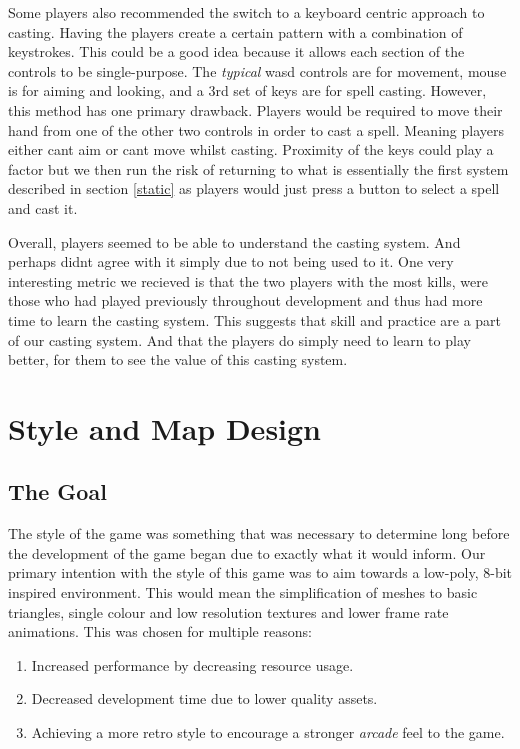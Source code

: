 \documentclass[12pt,a4paper]{report}
\begin{document}
Some players also recommended the switch to a keyboard centric approach to casting. Having the players create a certain pattern with a combination of keystrokes. This could be a good idea because it allows each section of the controls to be single-purpose. The \textit{typical} wasd controls are for movement, mouse is for aiming and looking, and a 3rd set of keys are for spell casting. However, this method has one primary drawback. Players would be required to move their hand from one of the other two controls in order to cast a spell. Meaning players either cant aim or cant move whilst casting. Proximity of the keys could play a factor but we then run the risk of returning to what is essentially the first system described in section \ref{static} as players would just press a button to select a spell and cast it.

Overall, players seemed to be able to understand the casting system. And perhaps didnt agree with it simply due to not being used to it. One very interesting metric we recieved is that the two players with the most kills, were those who had played previously throughout development and thus had more time to learn the casting system. This suggests that skill and practice are a part of our casting system. And that the players do simply need to learn to play better, for them to see the value of this casting system.

\chapter{Style and Map Design}

\section{The Goal}

The style of the game was something that was necessary to determine long before the development of the game began due to exactly what it would inform. Our primary intention with the style of this game was to aim towards a low-poly, 8-bit inspired environment. This would mean the simplification of meshes to basic triangles, single colour and low resolution textures and lower frame rate animations. This was chosen for multiple reasons:

\begin{enumerate}
	\item Increased performance by decreasing resource usage.
	\item Decreased development time due to lower quality assets.
	\item Achieving a more retro style to encourage a stronger \textit{arcade} feel to the game.
\end{enumerate}
\end{document}
